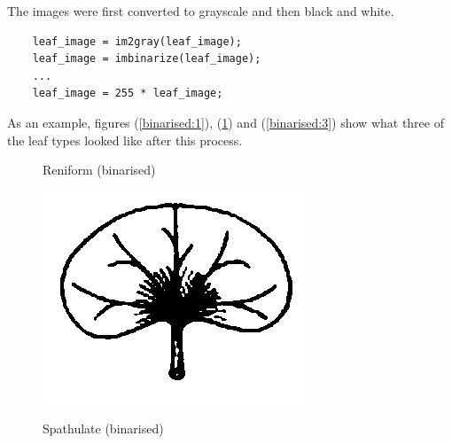 \documentclass[12pt,english]{article}
\begin{document}
The images were first converted to grayscale and then black and white.
\begin{verbatim}
    leaf_image = im2gray(leaf_image);
    leaf_image = imbinarize(leaf_image);
    ...
    leaf_image = 255 * leaf_image;
\end{verbatim}
As an example, figures (\ref{binarised:1}), (\ref{binarised:2}) and (\ref{binarised:3}) show what three of the leaf types looked like after
this process.
\begin{figure}[!hbt]
\begin{centre}
	\begin{minipage}{0.32\textwidth}
		\caption{Reniform (binarised)}
		\label{binarised:1}
		\includegraphics[width=\textwidth]{../code/contour/binarised/reniform}
	\end{minipage}
	\begin{minipage}{0.32\textwidth}
		\caption{Spathulate (binarised)}
		\label{binarised:2}

\end{minipage}
\end{centre}
\end{figure}
\end{document}
